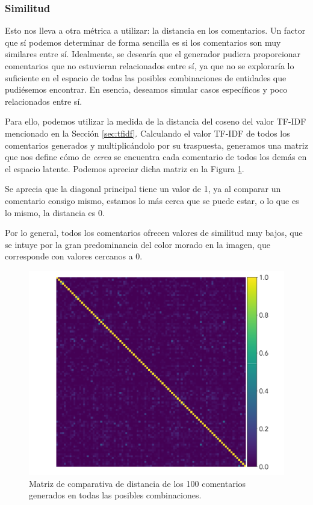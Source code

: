 \subsubsection{Similitud}
Esto nos lleva a otra métrica a utilizar: la distancia en los comentarios. Un factor que sí podemos determinar de forma sencilla es si los comentarios son muy similares entre sí. Idealmente, se desearía que el generador pudiera proporcionar comentarios que no estuvieran relacionados entre sí, ya que no se exploraría lo suficiente en el espacio de todas las posibles combinaciones de entidades que pudiésemos encontrar. En esencia, deseamos simular casos específicos y poco relacionados entre sí.

Para ello, podemos utilizar la medida de la distancia del coseno del valor TF-IDF mencionado en la  Sección \ref{sec:tfidf}. Calculando el valor TF-IDF de todos los comentarios generados y multiplicándolo por su traspuesta, generamos una matriz que nos define cómo de \textit{cerca} se encuentra cada comentario de todos los demás en el espacio latente. Podemos apreciar dicha matriz en la Figura \ref{fig:conf-tfidf}.

Se aprecia que la diagonal principal tiene un valor de 1, ya al comparar un comentario consigo mismo, estamos lo más cerca que se puede estar, o lo que es lo mismo, la distancia es 0.

Por lo general, todos los comentarios ofrecen valores de similitud muy bajos, que se intuye por la gran predominancia del color morado en la imagen, que corresponde con valores cercanos a 0.

\begin{figure}[h]
	\centering
	\includegraphics[width=.6\textwidth]{media/conf_matrix_tfidf.pdf}
	\caption{Matriz de comparativa de distancia de los 100 comentarios generados en todas las posibles combinaciones.}
	\label{fig:conf-tfidf}
\end{figure}



